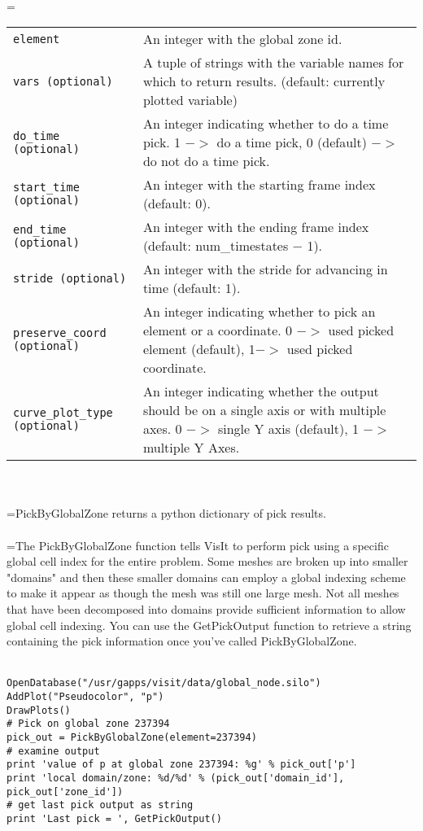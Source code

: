 \documentclass[10pt,a4paper]{report}
\begin{document}
 \\ 
\hangindent=\parindent 
\begin{tabular}{lp{9cm}}
\verb!element! & An integer with the global zone id. \\
\verb!vars (optional)! & A tuple of strings with the variable names for which to return results. (default: currently plotted variable) \\
\verb!do_time (optional)! & An integer indicating whether to do a time pick. 1 $-$$>$ do a time pick, 0 (default) $-$$>$ do not do a time pick. \\
\verb!start_time (optional)! & An integer with the starting frame index (default: 0). \\
\verb!end_time (optional)! & An integer with the ending frame index (default: num\_timestates $-$ 1). \\
\verb!stride (optional)! & An integer with the stride for advancing in time (default: 1). \\
\verb!preserve_coord (optional)! & An integer indicating whether to pick an element or a coordinate. 0 $-$$>$ used picked element (default), 1$-$$>$ used picked coordinate. \\
\verb!curve_plot_type (optional)! & An integer indicating whether the output should be on a single axis or with multiple axes. 0 $-$$>$ single Y axis (default), 1 $-$$>$ multiple Y Axes. \\
\end{tabular} \\[-2mm]


 \\ 
\hangindent=\parindent PickByGlobalZone returns a python dictionary of pick results. \\[-3mm] 

 \\ 
\hangindent=\parindent The PickByGlobalZone function tells VisIt to perform pick using a specific global cell index for the entire problem. Some meshes are broken up into smaller "domains" and then these smaller domains can employ a global indexing scheme to make it appear as though the mesh was still one large mesh. Not all meshes that have been decomposed into domains provide sufficient information to allow global cell indexing. You can use the GetPickOutput function to retrieve a string containing the pick information once you've called PickByGlobalZone. \\[-3mm] 

\\[-6mm]
\begin{verbatim}OpenDatabase("/usr/gapps/visit/data/global_node.silo")
AddPlot("Pseudocolor", "p")
DrawPlots()
# Pick on global zone 237394
pick_out = PickByGlobalZone(element=237394)
# examine output
print 'value of p at global zone 237394: %g' % pick_out['p']
print 'local domain/zone: %d/%d' % (pick_out['domain_id'], pick_out['zone_id'])
# get last pick output as string
print 'Last pick = ', GetPickOutput()
\end{verbatim}
\newpage
\end{document}
